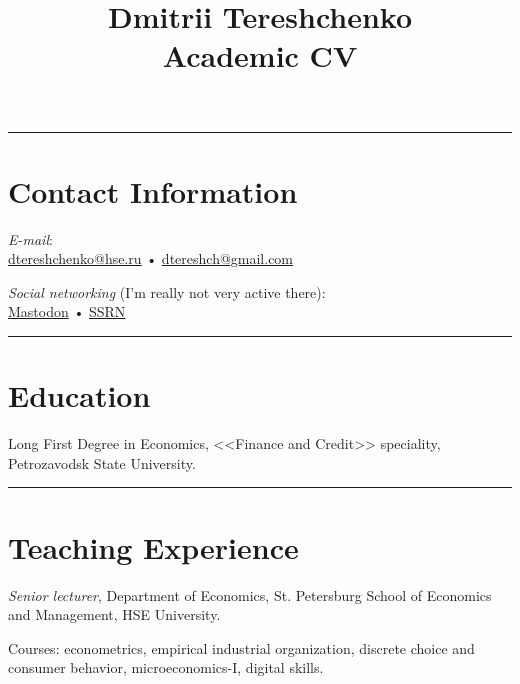 \documentclass[10pt]{article}
\title{\textbf{Dmitrii Tereshchenko}\\Academic CV}
\author{}
\date{}
\newcommand{\years}[1]{\marginnote{\scriptsize #1}}
\begin{document}
\maketitle

\hrule
\section*{Contact Information}
\noindent

	\textit{E-mail}: \\
	\href{mailto:dtereshchenko@hse.ru}{dtereshchenko@hse.ru}  • 
	\href{mailto:dtereshch@gmail.com}{dtereshch@gmail.com}\\
	
	\vspace{0.5em}

	\textit{Social networking} (I'm really not very active there): \\
        \href{https://econtwitter.net/@dtereshch}{Mastodon}  • 
        \href{https://papers.ssrn.com/sol3/cf_dev/AbsByAuth.cfm?per_id=2298921}{SSRN}

\vspace{2em}
\hrule


\section*{Education}
\noindent
\years{2005-2010}Long First Degree in Economics, <<Finance and Credit>> speciality, Petrozavodsk State University. \\

\vspace{2em}
\hrule


\section*{Teaching Experience}
\noindent
\years{2018-\dots}\textit{Senior lecturer}, Department of Economics, St. Petersburg School of Economics and Management, HSE University.

\vspace{1em}
Courses: econometrics, empirical industrial organization, discrete choice and consumer behavior, microeconomics-I, digital skills.
\end{document}
